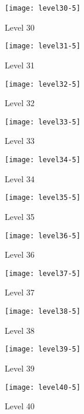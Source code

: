 \begin{figure}
  \centering
  \texttt{[image: level30-5]}
  \caption{Level 30}
  \label{fig:level30-stats}
\end{figure}

\clearpage

\begin{figure}
  \centering
  \texttt{[image: level31-5]}
  \caption{Level 31}
  \label{fig:level31-stats}
\end{figure}
 
\begin{figure}
  \centering
  \texttt{[image: level32-5]}
  \caption{Level 32}
  \label{fig:level32-stats}
\end{figure}

\begin{figure}
  \centering
  \texttt{[image: level33-5]}
  \caption{Level 33}
  \label{fig:level33-stats}
\end{figure}
 
\begin{figure}
  \centering
  \texttt{[image: level34-5]}
  \caption{Level 34}
  \label{fig:level34-stats}
\end{figure}

\begin{figure}
  \centering
  \texttt{[image: level35-5]}
  \caption{Level 35}
  \label{fig:level35-stats}
\end{figure}
 
\begin{figure}
  \centering
  \texttt{[image: level36-5]}
  \caption{Level 36}
  \label{fig:level36-stats}
\end{figure}

\begin{figure}
  \centering
  \texttt{[image: level37-5]}
  \caption{Level 37}
  \label{fig:level37-stats}
\end{figure}
 
\begin{figure}
  \centering
  \texttt{[image: level38-5]}
  \caption{Level 38}
  \label{fig:level38-stats}
\end{figure}

\begin{figure}
  \centering
  \texttt{[image: level39-5]}
  \caption{Level 39}
  \label{fig:level39-stats}
\end{figure}
 
\begin{figure}
  \centering
  \texttt{[image: level40-5]}
  \caption{Level 40}
  \label{fig:level40-stats}
\end{figure}

\clearpage

